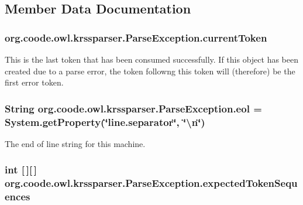 \subsection{Member Data Documentation}
\hypertarget{classorg_1_1coode_1_1owl_1_1krssparser_1_1_parse_exception_a89ee6ad992183aa86c5c6be1837a8533}{
\subsubsection[{current\-Token}]{ org.\-coode.\-owl.\-krssparser.\-Parse\-Exception.\-current\-Token}}\label{classorg_1_1coode_1_1owl_1_1krssparser_1_1_parse_exception_a89ee6ad992183aa86c5c6be1837a8533}
This is the last token that has been consumed successfully. If this object has been created due to a parse error, the token followng this token will (therefore) be the first error token. \hypertarget{classorg_1_1coode_1_1owl_1_1krssparser_1_1_parse_exception_a09b01bc5e1390bc2eb2c7e1979c369e8}{
\subsubsection[{eol}]{\setlength{\rightskip}{0pt plus 5cm}String org.\-coode.\-owl.\-krssparser.\-Parse\-Exception.\-eol = System.\-get\-Property(\char`\"{}line.\-separator\char`\"{}, \char`\"{}\textbackslash{}n\char`\"{})\hspace{0.3cm}{\ttfamily [protected]}}}\label{classorg_1_1coode_1_1owl_1_1krssparser_1_1_parse_exception_a09b01bc5e1390bc2eb2c7e1979c369e8}
The end of line string for this machine. \hypertarget{classorg_1_1coode_1_1owl_1_1krssparser_1_1_parse_exception_aa0ae4f7b0293b5858c90e5b2db994f3c}{
\subsubsection[{expected\-Token\-Sequences}]{\setlength{\rightskip}{0pt plus 5cm}int \mbox{[}$\,$\mbox{]}\mbox{[}$\,$\mbox{]} org.\-coode.\-owl.\-krssparser.\-Parse\-Exception.\-expected\-Token\-Sequences}}\label{classorg_1_1coode_1_1owl_1_1krssparser_1_1_parse_exception_aa0ae4f7b0293b5858c90e5b2db994f3c}
